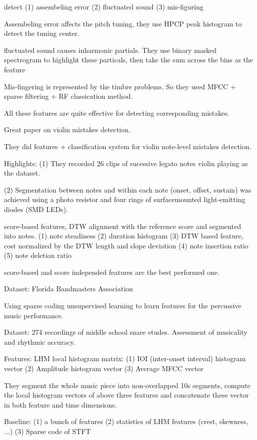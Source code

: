  detect (1) assembeling error (2) fluctuated sound (3) mis-figuring

Assembeling error affects the pitch tuning, they use HPCP peak histogram to detect the tuning center.

fluctuated sound causes inharmonic partials. They use binary masked spectrogram to highlight these particals, then take the sum across the bins as the feature

Mis-fingering is represented by the timbre problems. So they used MFCC + sparse filtering + RF classication method.

All these features are quite effective for detecting corresponding mistakes.

 Great paper on violin mistakes detection.

They did features + classification system for violin note-level mistakes detection.

Highlights:
(1) They recorded 26 clips of sucessive legato notes violin playing as the dataset.

(2) Segmentation between notes and within each note (onset, offset, sustain) was achieved using a photo resistor and four rings of surfacemounted light-emitting diodes (SMD LEDs).

 score-based features, DTW alignment with the reference score and segmented into notes.
(1) note steadiness
(2) duration histogram
(3) DTW based feature, cost normalized by the DTW length and slope deviation
(4) note insertion ratio
(5) note deletion ratio

score-based and score independed features are the best performed one.

Dataset:
Florida Bandmasters Association

 Using sparse coding unsupervised learning to learn features for the percussive music performance.

Dataset: 274 recordings of middle school snare etudes. Assessment of musicality and rhythmic accuracy. 

Features:
LHM local histogram matrix:
(1) IOI (inter-onset interval) histogram vector
(2) Amplitude histogram vector
(3) Average MFCC vector

They segment the whole music piece into non-overlapped 10s segments, compute the local histogram vectors of above three features and concatenate these vector in both feature and time dimensions.

Baseline:
(1) a bunch of features
(2) statistics of LHM features (crest, skewness, ...)
(3) Sparse code of STFT

